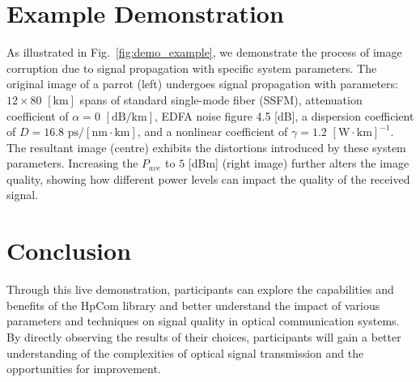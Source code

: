 \section{Example Demonstration}

As illustrated in Fig.~\ref{fig:demo_example}, we demonstrate the process of image corruption due to signal propagation with specific system parameters. The original image of a parrot (left) undergoes signal propagation with parameters: $12 \times 80$ $[\textrm{km}]$ spans of standard single-mode fiber (SSFM), attenuation coefficient of $\alpha = 0$ $[\textrm{dB}/\textrm{km}]$, EDFA noise figure 4.5 \textrm{[dB]}, a dispersion coefficient of $D = 16.8$ $\textrm{ps}/[\textrm{nm} \cdot \textrm{km}]$, and a nonlinear coefficient of $\gamma = 1.2$ $[\textrm{W} \cdot \textrm{km}]^{-1}$. The resultant image (centre) exhibits the distortions introduced by these system parameters. Increasing the $P_{ave}$ to $5$ \textrm{[dBm]} (right image) further alters the image quality, showing how different power levels can impact the quality of the received signal.



\section{Conclusion}

Through this live demonstration, participants can explore the capabilities and benefits of the HpCom library and better understand the impact of various parameters and techniques on signal quality in optical communication systems. By directly observing the results of their choices, participants will gain a better understanding of the complexities of optical signal transmission and the opportunities for improvement.
